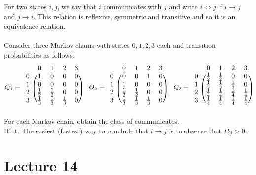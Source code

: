 \documentclass[12pt]{article}
\begin{document}
For two states $i,j$, we say that $i$ communicates with $j$ and write $i \iff j$ if $i \to j$ and $j \to i$. This relation is reflexive, symmetric and transitive and so it is an equivalence relation. \\~\\
Consider three Markov chains with states $0,1,2,3$ each and transition probabilities as follows: 
$$ Q_1 = \begin{blockarray}{ccccc}
&0&1&2&3 \\
\begin{block}{c(cccc)}
0 & 1 & 0 & 0 & 0 \\
1 & 0 & 0 & 0 & 0 \\
2 & \frac{1}{2} & \frac{1}{2} & 0 & 0 \\
3 & \frac{1}{3} & \frac{1}{3} & \frac{1}{3} & 0 \\ \end{block} \end{blockarray}~~~ Q_2 = 
\begin{blockarray}{ccccc}
&0&1&2&3 \\
\begin{block}{c(cccc)}
0 & 0 & 0 & 1 & 0 \\
1 & 1 & 0 & 0 & 0 \\
2 & \frac{1}{2} & \frac{1}{2} & 0 & 0 \\
3 & \frac{1}{3} & \frac{1}{3} & \frac{1}{3} & 0 \\ \end{block} \end{blockarray}~~~ Q_3 = 
\begin{blockarray}{ccccc}
&0&1&2&3 \\
\begin{block}{c(cccc)}
0 & \frac{1}{2} & \frac{1}{2} & 0 & 0 \\
1 & \frac{1}{3} & \frac{1}{3} & \frac{1}{3} & 0 \\ 
2 & \frac{1}{4} & \frac{1}{4} & \frac{1}{4} & \frac{1}{4} \\ 
3 & \frac{1}{4} & \frac{1}{4} & \frac{1}{4} & \frac{1}{4} \\ \end{block} \end{blockarray} $$
For each Markov chain, obtain the class of communicates. \\
Hint: The easiest (fastest) way to conclude that $i \to j$ is to observe that $P_{ij} > 0$.   

\section{Lecture 14} 
\end{document}

